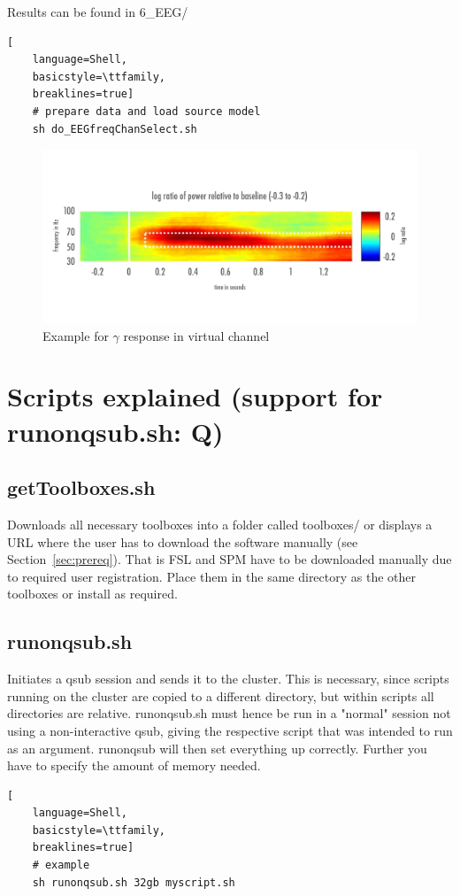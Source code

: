\documentclass[12pt,a4paper]{scrartcl}
\begin{document}
\noindent Results can be found in 6\_EEG/\\
\begin{lstlisting}[
    language=Shell,
    basicstyle=\ttfamily,
    breaklines=true]
    # prepare data and load source model
    sh do_EEGfreqChanSelect.sh
\end{lstlisting}
\begin{figure}
\begin{center}
\includegraphics[width=1\textwidth]{exampleGamma}
\caption[Example for $\gamma$ response in virtual channel]{Example for $\gamma$ response in virtual channel}
\label{fig:exampleGamma}
\end{center}
\end{figure}
\FloatBarrier

\section{Scripts explained (support for runonqsub.sh: Q)}
\label{sec:scriptsExplained}
\subsection{getToolboxes.sh}
\label{sec:getTools}
Downloads all necessary toolboxes into a folder called toolboxes/ or displays a URL where the user has to download the software manually (see Section~\ref{sec:prereq}). That is FSL and SPM have to be downloaded manually due to required user registration. Place them in the same directory as the other toolboxes or install as required.

\subsection{runonqsub.sh}
Initiates a qsub session and sends it to the cluster. This is necessary, since scripts running on the cluster are copied to a different directory, but within scripts all directories are relative. runonqsub.sh must hence be run in a "normal" session not using a non-interactive qsub, giving the respective script that was intended to run as an argument. runonqsub will then set everything up correctly. Further you have to specify the amount of memory needed.
\begin{lstlisting}[
    language=Shell,
    basicstyle=\ttfamily,
    breaklines=true]
    # example
    sh runonqsub.sh 32gb myscript.sh
\end{lstlisting}
\end{document}
